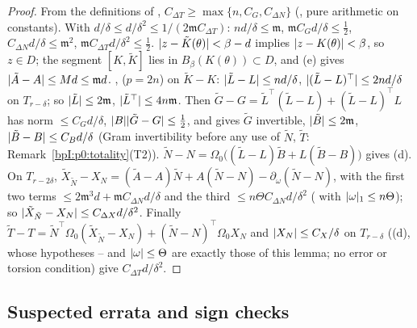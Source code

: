 \begin{proof}
\label{stepI:p1:pt-small}
From the definitions of , $C_{\Delta T}\ge\max\{n,C_G,C_{\Delta N}\}$ (, pure arithmetic on constants). With $d/\delta\le d/\delta^2\le1/(2\mathfrak mC_{\Delta T})$:
$nd/\delta\le\mathfrak m$, $\mathfrak mC_Gd/\delta\le\frac12$, $C_{\Delta N}d/\delta\le\mathfrak m^2$, $\mathfrak mC_{\Delta T}d/\delta^2\le\frac12$.
\label{stepI:p1:pt-domain}
$\lvert z-\tilde K(\theta)\rvert<\beta-d$ implies $\lvert z-K(\theta)\rvert<\beta$, so $z\in D$; the segment $[K,\tilde K]$ lies in $B_\beta(K(\theta))\subset D$, and (e) gives $\lvert \tilde A-A\rvert\le Md\le\mathfrak md$.
\label{stepI:p1:pt-frame}
,  ($p=2n$) on $\tilde K-K$: $\lvert \tilde L-L\rvert\le nd/\delta$, $\lvert (\tilde L-L)^\top\rvert\le2nd/\delta$ on $T_{r-\delta}$; so $\lvert \tilde L\rvert\le2\mathfrak m$, $\lvert \tilde L^\top\rvert\le4n\mathfrak m$. Then $\tilde G-G=\tilde L^\top(\tilde L-L)+(\tilde L-L)^\top L$ has norm $\le C_Gd/\delta$, $\lvert B\rvert\lvert \tilde G-G\rvert\le\frac12$, and  gives $\tilde G$ invertible, $\lvert \tilde B\rvert\le2\mathfrak m$, $\lvert \tilde B-B\rvert\le C_Bd/\delta$ (Gram invertibility before any use of $\tilde N$, $\tilde T$: Remark~\ref{bpI:p0:totality}(T2)).
\label{stepI:p1:pt-torsion}
$\tilde N-N=\Omega_0\bigl((\tilde L-L)\tilde B+L(\tilde B-B)\bigr)$ gives (d). On $T_{r-2\delta}$,
$\tilde X_{\tilde N}-X_N=(\tilde A-A)\tilde N+A(\tilde N-N)-\partial_\omega(\tilde N-N)$, with the first two terms $\le2\mathfrak m^3d+\mathfrak mC_{\Delta N}d/\delta$ and the third $\le n\Theta C_{\Delta N}d/\delta^2$ ( with $\lvert \omega\rvert_1\le n\Theta$); so $\lvert \tilde X_{\tilde N}-X_N\rvert\le C_{\Delta X}d/\delta^2$. Finally
$\tilde T-T=\tilde N^\top\Omega_0(\tilde X_{\tilde N}-X_N)+(\tilde N-N)^\top\Omega_0X_N$ and $\lvert X_N\rvert\le C_X/\delta$ on $T_{r-\delta}$ ((d), whose hypotheses -- and $\lvert \omega\rvert\le\Theta$ are exactly those of this lemma; no error or torsion condition) give $C_{\Delta T}d/\delta^2$.
\end{proof}


\subsection{Suspected errata and sign checks}\label{bpI:p1:sec-errata}

